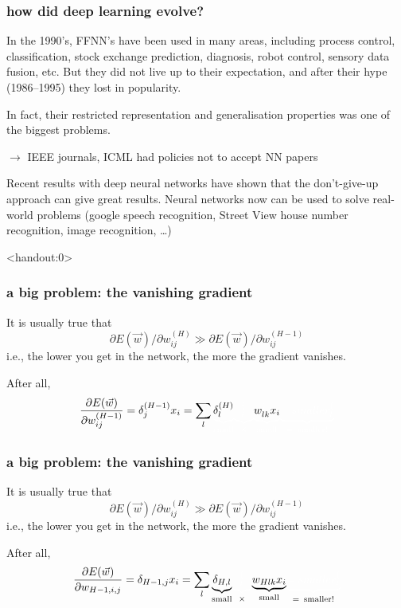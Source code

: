 \documentclass[USenglish,pdftex,compress,10pt,svgnamesi,handout]{beamer}
\newcommand{\bfw}{\Vec{w}}
\def\hid{{H}}
\begin{document}
\begin{frame}
\frametitle{how did deep learning evolve?}

In the 1990's, FFNN's have been used in many areas, including process control, classification, stock exchange prediction, diagnosis, robot control, sensory data fusion, etc. But they did not live up to their expectation, and after their hype (1986--1995) they lost in popularity.  

In fact, their restricted representation and generalisation properties was one of the biggest problems.

$\rightarrow$ IEEE journals, ICML had policies not to accept NN papers

Recent results with deep neural networks have shown that the don't-give-up approach can give great results.  Neural networks now can be used to solve real-world problems (google speech recognition, Street View house number recognition, image recognition, \dots)
\end{frame}




\def\i#1{\textcolor{white}{#1}}

\begin{frame}<handout:0>
\frametitle{a big problem: the vanishing gradient}
It is usually true that 
$$  \partial E(\bfw) / \partial w_{ij}^{(\hid)}
  \gg
    \partial E(\bfw) / \partial w_{ij}^{(\hid-1)}
$$
i.e., the lower you get in the network, the more the gradient vanishes.

After all,
$$
{\partial E(\bfw)  \over \partial w_{ij}^{(\hid-1)} }
    = \delta^{(\hid-1)}_j x_i 
    = \sum_l \i{\underbrace{\textcolor{black}{\delta_l^{(\hid)}}}_{\mathrm{small}}}
    	\i{\underbrace{{}_l^(}_{\i{\times}}}
	\i{\underbrace{ \textcolor{black}{w_{lk}^{\i(} x_i }}_{\mathrm{small}}}
	\i{\underbrace{=smaller_l^(}_{=\,\,\,\mathrm{smaller!}}} 
$$\end{frame}

\begin{frame}
\frametitle{a big problem: the vanishing gradient}
It is usually true that 
$$  \partial E(\bfw) / \partial w_{ij}^{(\hid)}
  \gg
    \partial E(\bfw) / \partial w_{ij}^{(\hid-1)}
$$
i.e., the lower you get in the network, the more the gradient vanishes.

After all,
$$
{\partial E(\bfw)  \over \partial w_{\hid-1,i,j} }
    = \delta_{\hid-1,j} x_i 
    = \sum_l {\underbrace{\textcolor{black}{\delta_{\hid,l}}}_{\mathrm{small}}}
    	\i{\underbrace{{}_l^(}_{\textcolor{black}{\times}}}
	{\underbrace{ \textcolor{black}{w_{Hlk} x_i }}_{\mathrm{small}}}
	\i{\underbrace{=smaller_l^(}_{\textcolor{black}{=\,\,\,\mathrm{smaller!}}}}
$$\end{frame}
\end{document}
